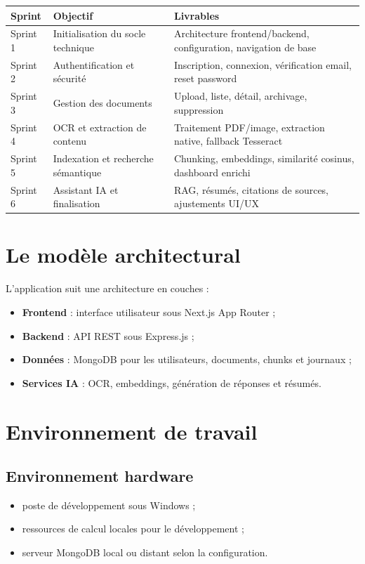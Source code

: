\documentclass[12pt,a4paper]{report}
\begin{document}
\begin{longtable}{>{\raggedright\arraybackslash}p{1.9cm} >{\raggedright\arraybackslash}p{4.8cm} >{\raggedright\arraybackslash}p{6.7cm}}
\toprule
Sprint & Objectif & Livrables \\
\midrule
Sprint 1 & Initialisation du socle technique & Architecture frontend/backend, configuration, navigation de base \\
Sprint 2 & Authentification et sécurité & Inscription, connexion, vérification email, reset password \\
Sprint 3 & Gestion des documents & Upload, liste, détail, archivage, suppression \\
Sprint 4 & OCR et extraction de contenu & Traitement PDF/image, extraction native, fallback Tesseract \\
Sprint 5 & Indexation et recherche sémantique & Chunking, embeddings, similarité cosinus, dashboard enrichi \\
Sprint 6 & Assistant IA et finalisation & RAG, résumés, citations de sources, ajustements UI/UX \\
\bottomrule
\end{longtable}

\section{Le modèle architectural}
L'application suit une architecture en couches :
\begin{itemize}
  \item \textbf{Frontend} : interface utilisateur sous Next.js App Router ;
  \item \textbf{Backend} : API REST sous Express.js ;
  \item \textbf{Données} : MongoDB pour les utilisateurs, documents, chunks et journaux ;
  \item \textbf{Services IA} : OCR, embeddings, génération de réponses et résumés.
\end{itemize}

\section{Environnement de travail}

\subsection{Environnement hardware}
\begin{itemize}
  \item poste de développement sous Windows ;
  \item ressources de calcul locales pour le développement ;
  \item serveur MongoDB local ou distant selon la configuration.
\end{itemize}
\end{document}
